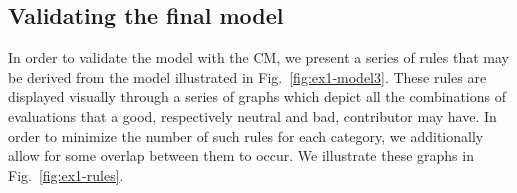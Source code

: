 \subsection{Validating the final model}

In order to validate the model with the CM, we present a series of rules that may be derived from the model illustrated in Fig.~\ref{fig:ex1-model3}. These rules are displayed visually through a series of graphs which depict all the combinations of evaluations that a good, respectively neutral and bad, contributor may have. In order to minimize the number of such rules for each category, we additionally allow for some overlap between them to occur. We illustrate these graphs in Fig.~\ref{fig:ex1-rules}.

